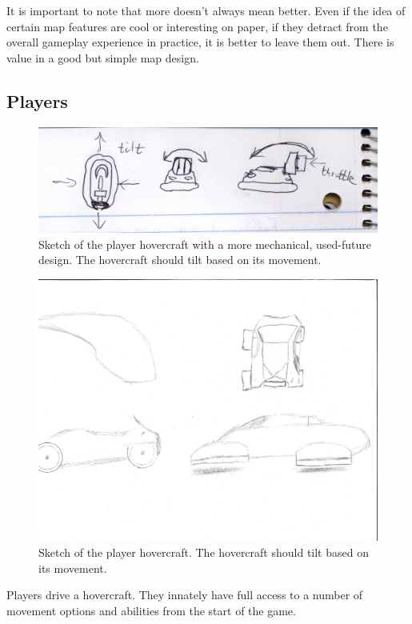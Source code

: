 \documentclass{article}
\theoremstyle{definition}
\begin{document}
It is important to note that more doesn't always mean better. Even if the idea
of certain map features are cool or interesting on paper, if they detract from
the overall gameplay experience in practice, it is better to leave them out.
There is value in a good but simple map design.

\subsection{Players}

\begin{figure}[htpb]
  \centering
  \includegraphics[width=0.8\linewidth]{Brainstorming_003.png}
  \caption{Sketch of the player hovercraft with a more mechanical, used-future
  design. The hovercraft should tilt based on its movement.}
\label{fig:Brainstorming_003}
\end{figure}

\begin{figure}[htpb]
  \centering
  \includegraphics[width=0.8\linewidth]{austin_car1.pdf}
  \caption{Sketch of the player hovercraft. The hovercraft should tilt based on
  its movement.}
\label{fig:austin_car1}
\end{figure}

Players drive a hovercraft. They innately have full access to a number of
movement options and abilities from the start of the game.
\end{document}
